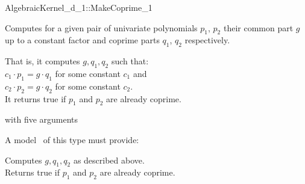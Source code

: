 \begin{ccRefFunctionObjectConcept}{AlgebraicKernel_d_1::MakeCoprime_1}

\ccDefinition
Computes for a given pair of univariate polynomials $p_1$, $p_2$ their
common part $g$ up to a constant factor and coprime parts $q_1$, $q_2$ 
respectively. 

That is, it computes $g, q_1, q_2$ such that:\\
\hspace{1cm} $c_1 \cdot p_1 =  g \cdot q_1$ for some constant $c_1$ and\\
\hspace{1cm} $c_2 \cdot p_2 =  g \cdot q_2$ for some constant $c_2$.\\


It returns true if $p_1$ and $p_2$ are already coprime.

\ccRefines 
{} with five arguments 

\ccTypes
{}

\ccOperations
{}
A model \ccVar\ of this type must provide:

{ Computes $g, q_1, q_2$ as described above.\\
Returns true if $p_1$ and $p_2$ are already coprime. 
}

\ccSeeAlso
{}\\

\end{ccRefFunctionObjectConcept}
